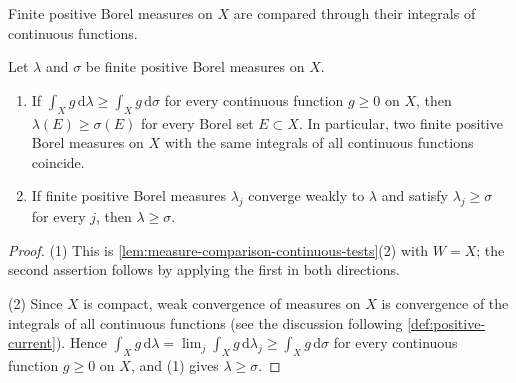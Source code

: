 Finite positive Borel measures on $X$ are compared through their integrals of continuous functions.

\begin{lemma}\label{lem:global-measure-continuous-comparison}
Let $\lambda$ and $\sigma$ be finite positive Borel measures on $X$.
\begin{enumerate}
 \item If $\int_Xg\,\mathrm d\lambda\geq\int_Xg\,\mathrm d\sigma$ for every continuous function $g\geq0$ on $X$, then $\lambda(E)\geq\sigma(E)$ for every Borel set $E\subset X$. In particular, two finite positive Borel measures on $X$ with the same integrals of all continuous functions coincide.
 \item If finite positive Borel measures $\lambda_j$ converge weakly to $\lambda$ and satisfy $\lambda_j\geq\sigma$ for every $j$, then $\lambda\geq\sigma$.
\end{enumerate}
\end{lemma}
\begin{proof}
(1) This is \cref{lem:measure-comparison-continuous-tests}(2) with $W=X$; the second assertion follows by applying the first in both directions.

(2) Since $X$ is compact, weak convergence of measures on $X$ is convergence of the integrals of all continuous functions (see the discussion following \cref{def:positive-current}). Hence $\int_Xg\,\mathrm d\lambda=\lim_j\int_Xg\,\mathrm d\lambda_j\geq\int_Xg\,\mathrm d\sigma$ for every continuous function $g\geq0$ on $X$, and (1) gives $\lambda\geq\sigma$.
\end{proof}

